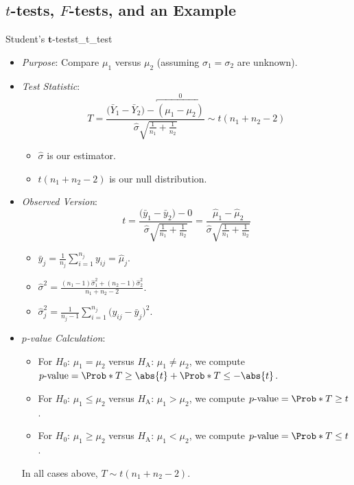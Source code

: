 \subsection*{$ t $-tests, $ F $-tests, and an Example}
\begin{Statistical_Test}{Student's $ \symbf{t} $-test}{st_t_test}
      \begin{itemize}
            \item \emph{Purpose}: Compare $ \mu_1 $ versus $ \mu_2 $ (assuming $ \sigma_1=\sigma_2 $ are unknown).
            \item \emph{Test Statistic}:
                  \[ T=\frac{\bigl(\bar{Y}_1-\bar{Y}_2\bigr)-\overbracket{(\mu_1-\mu_2)}^0}{\displaystyle \hat{\sigma}\sqrt{\frac{1}{n_1}+\frac{1}{n_2}}}\sim t(n_1+n_2-2) \]
                  \begin{itemize}
                        \item $ \hat{\sigma} $ is our estimator.
                        \item $ t(n_1+n_2-2) $ is our null distribution.
                  \end{itemize}
            \item \emph{Observed Version}:
                  \[ t=\frac{\bigl(\bar{y}_1-\bar{y}_2\bigr)-0}{\displaystyle \hat{\sigma}\sqrt{\frac{1}{n_1}+\frac{1}{n_2}}}
                        =\frac{\hat{\mu}_1-\hat{\mu}_2}{\displaystyle \hat{\sigma}\sqrt{\frac{1}{n_1}+\frac{1}{n_2}}} \]
                  \begin{itemize}
                        \item $ \displaystyle \bar{y}_j= \frac{1}{n_j}\sum_{i=1}^{n_j} y_{ij}=\hat{\mu}_j $.
                        \item $ \displaystyle \hat{\sigma}^2=\frac{(n_1-1)\hat{\sigma}_1^2+(n_2-1)\hat{\sigma}_2^2}{n_1+n_2-2} $.
                        \item $ \displaystyle \hat{\sigma}_j^2=\frac{1}{n_j-1} \sum_{i=1}^{n_j} \bigl(y_{ij}-\bar{y}_j\bigr)^2 $.
                  \end{itemize}
            \item \emph{$ p $-value Calculation}:
                  \begin{itemize}
                        \item For $ H_0 $: $ \mu_1=\mu_2 $ versus $ H_\text{A} $: $ \mu_1\ne\mu_2 $, we compute
                              $ p\text{-value}=\Prob*{T\ge \abs{t}}+\Prob*{T\le -\abs{t}} $.
                        \item For $ H_0 $: $ \mu_1\le\mu_2 $ versus $ H_\text{A} $: $ \mu_1>\mu_2 $, we compute
                              $ p\text{-value}=\Prob*{T\ge t} $.
                        \item For $ H_0 $: $ \mu_1\ge\mu_2 $ versus $ H_\text{A} $: $ \mu_1<\mu_2 $, we compute
                              $ p\text{-value}=\Prob*{T\le t} $.
                  \end{itemize}
                  \begin{Remark}{}{}
                        In all cases above, $ T \sim t(n_1+n_2-2) $.
                  \end{Remark}
      \end{itemize}
\end{Statistical_Test}
